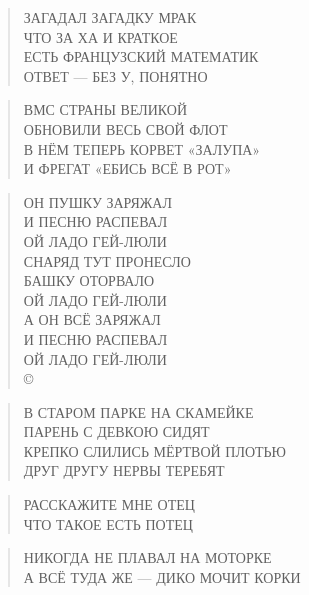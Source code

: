\poemtitle{***}
\begin{verse}
ЗАГАДАЛ ЗАГАДКУ МРАК\\
ЧТО ЗА ХА И КРАТКОЕ\\
ЕСТЬ ФРАНЦУЗСКИЙ МАТЕМАТИК\\
ОТВЕТ — БЕЗ У, ПОНЯТНО
\end{verse}

\poemtitle{***}
\begin{verse}
ВМС СТРАНЫ ВЕЛИКОЙ\\
ОБНОВИЛИ ВЕСЬ СВОЙ ФЛОТ\\
В НЁМ ТЕПЕРЬ КОРВЕТ «ЗАЛУПА»\\
И ФРЕГАТ «ЕБИСЬ ВСЁ В РОТ»
\end{verse}

\poemtitle{***}
\begin{verse}
ОН ПУШКУ ЗАРЯЖАЛ\\
И ПЕСНЮ РАСПЕВАЛ\\
ОЙ ЛАДО ГЕЙ-ЛЮЛИ\\
СНАРЯД ТУТ ПРОНЕСЛО\\
БАШКУ ОТОРВАЛО\\
ОЙ ЛАДО ГЕЙ-ЛЮЛИ\\
А ОН ВСЁ ЗАРЯЖАЛ\\
И ПЕСНЮ РАСПЕВАЛ\\
ОЙ ЛАДО ГЕЙ-ЛЮЛИ\\
©
\end{verse}

\poemtitle{***}
\begin{verse}
В СТАРОМ ПАРКЕ НА СКАМЕЙКЕ\\
ПАРЕНЬ С ДЕВКОЮ СИДЯТ\\
КРЕПКО СЛИЛИСЬ МЁРТВОЙ ПЛОТЬЮ\\
ДРУГ ДРУГУ НЕРВЫ ТЕРЕБЯТ
\end{verse}

\poemtitle{***}
\begin{verse}
РАССКАЖИТЕ МНЕ ОТЕЦ\\
ЧТО ТАКОЕ ЕСТЬ ПОТЕЦ
\end{verse}

\poemtitle{***}
\begin{verse}
НИКОГДА НЕ ПЛАВАЛ НА МОТОРКЕ\\
А ВСЁ ТУДА ЖЕ — ДИКО МОЧИТ КОРКИ
\end{verse}


